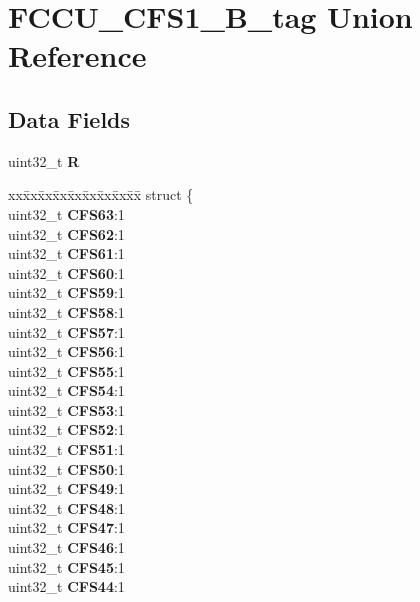 \hypertarget{unionFCCU__CFS1__32B__tag}{}\section{F\+C\+C\+U\+\_\+\+C\+F\+S1\+\_\+B\+\_\+tag Union Reference}
\label{unionFCCU__CFS1__32B__tag}
\subsection*{Data Fields}
\begin{DoxyCompactItemize}
\item 
\mbox{\label{unionFCCU__CFS1__32B__tag_a5401db073bdf7584ddb9aedc7c80f916}} 
uint32\+\_\+t {\bfseries R}
\item 
\mbox{\label{unionFCCU__CFS1__32B__tag_a8a0c7a7bcc17d1b6a767e32f25f69493}} 
\begin{tabbing}
xx\=xx\=xx\=xx\=xx\=xx\=xx\=xx\=xx\=\kill
struct \{\\
\>uint32\_t {\bfseries CFS63}:1\\
\>uint32\_t {\bfseries CFS62}:1\\
\>uint32\_t {\bfseries CFS61}:1\\
\>uint32\_t {\bfseries CFS60}:1\\
\>uint32\_t {\bfseries CFS59}:1\\
\>uint32\_t {\bfseries CFS58}:1\\
\>uint32\_t {\bfseries CFS57}:1\\
\>uint32\_t {\bfseries CFS56}:1\\
\>uint32\_t {\bfseries CFS55}:1\\
\>uint32\_t {\bfseries CFS54}:1\\
\>uint32\_t {\bfseries CFS53}:1\\
\>uint32\_t {\bfseries CFS52}:1\\
\>uint32\_t {\bfseries CFS51}:1\\
\>uint32\_t {\bfseries CFS50}:1\\
\>uint32\_t {\bfseries CFS49}:1\\
\>uint32\_t {\bfseries CFS48}:1\\
\>uint32\_t {\bfseries CFS47}:1\\
\>uint32\_t {\bfseries CFS46}:1\\
\>uint32\_t {\bfseries CFS45}:1\\
\>uint32\_t {\bfseries CFS44}:1\\

\end{tabbing}
\end{DoxyCompactItemize}
